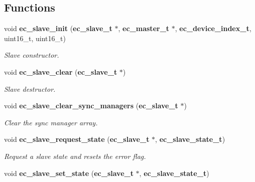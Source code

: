 \subsection*{Functions}
\begin{DoxyCompactItemize}
\item 
void {\bf ec\-\_\-slave\-\_\-init} ({\bf ec\-\_\-slave\-\_\-t} $\ast$, {\bf ec\-\_\-master\-\_\-t} $\ast$, {\bf ec\-\_\-device\-\_\-index\-\_\-t}, uint16\-\_\-t, uint16\-\_\-t)
\begin{DoxyCompactList}\small\item\em Slave constructor. \end{DoxyCompactList}\item 
void {\bf ec\-\_\-slave\-\_\-clear} ({\bf ec\-\_\-slave\-\_\-t} $\ast$)
\begin{DoxyCompactList}\small\item\em Slave destructor. \end{DoxyCompactList}\item 
void {\bf ec\-\_\-slave\-\_\-clear\-\_\-sync\-\_\-managers} ({\bf ec\-\_\-slave\-\_\-t} $\ast$)\label{slave_8h_a75ddcc7d265095322850d243007602b2}

\begin{DoxyCompactList}\small\item\em Clear the sync manager array. \end{DoxyCompactList}\item 
void {\bf ec\-\_\-slave\-\_\-request\-\_\-state} ({\bf ec\-\_\-slave\-\_\-t} $\ast$, {\bf ec\-\_\-slave\-\_\-state\-\_\-t})\label{slave_8h_a8b3d447dd21d0888959a5a3691597e77}

\begin{DoxyCompactList}\small\item\em Request a slave state and resets the error flag. \end{DoxyCompactList}\item 
void {\bf ec\-\_\-slave\-\_\-set\-\_\-state} ({\bf ec\-\_\-slave\-\_\-t} $\ast$, {\bf ec\-\_\-slave\-\_\-state\-\_\-t})\label{slave_8h_aaede3967b1b6c24a513006654b85ca8a}


\end{DoxyCompactItemize}
